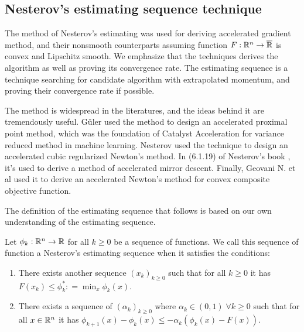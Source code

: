 \documentclass[12pt]{article}
\begin{document}
    \subsection{Nesterov's estimating sequence technique}
        The method of Nesterov's estimating was used for deriving accelerated gradient method, and their nonsmooth counterparts assuming function $F: \mathbb R^n \rightarrow \overline{\mathbb R}$ is convex and Lipschitz smooth. 
        We emphasize that the techniques derives the algorithm as well as proving its convergence rate. 
        The estimating sequence is a technique searching for candidate algorithm with extrapolated momentum, and proving their convergence rate if possible. 
        \par
        The method is widespread in the literatures, and the ideas behind it are tremendously useful. 
        Güler \cite{guler_new_1992} used the method to design an accelerated proximal point method, which was the foundation of Catalyst Acceleration for variance reduced method in machine learning. 
        Nesterov \cite{nesterov_accelerating_2008} used the technique to design an accelerated cubic regularized Newton's method. 
        In (6.1.19) of Nesterov's book \cite{nesterov_lectures_2018}, it's used to derive a method of accelerated mirror descent. 
        Finally, Geovani N. et al \cite{grapiglia_accelerated_2019} used it to derive an accelerated Newton's method for convex composite objective function. 
        \par
        The definition of the estimating sequence that follows is based on our own understanding of the estimating sequence. 
        \begin{definition}\label{def:nes-est-seq}
            Let $\phi_k : \mathbb R^n \rightarrow\mathbb R$ for all $k \ge 0$ be a sequence of functions. 
            We call this sequence of function a Nesterov's estimating sequence when it satisfies the conditions: 
            \begin{enumerate}
                \item There exists another sequence $(x_k)_{k \ge 0}$ such that for all $k \ge 0$ it has $F(x_k) \le \phi_k^*: =\min_{x}\phi_k(x)$. 
                \item There exists a sequence of $(\alpha_k)_{k \ge 0}$ where $\alpha_k \in (0, 1)\; \forall k \ge0 $ such that for all $x \in \mathbb R^n$ it has $\phi_{k + 1}(x) - \phi_k(x) \le - \alpha_k(\phi_k(x) - F(x))$. 
            \end{enumerate}
        \end{definition}
\end{document}
